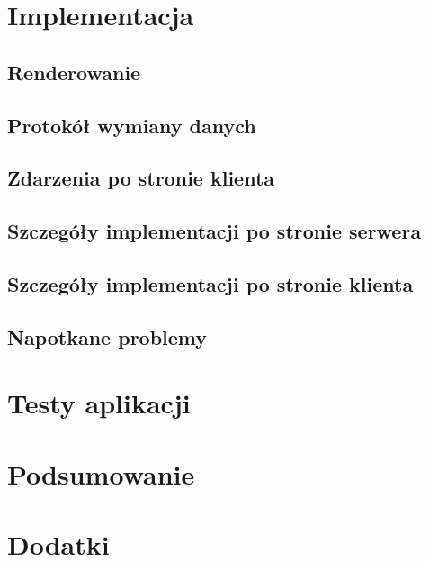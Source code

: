 \documentclass[polish]{inz}
\begin{document}
\chapter{Implementacja}
\section{Renderowanie}

\section{Protokół wymiany danych}
\label{data_protocol}

\section{Zdarzenia po stronie klienta}
\label{client_events}


\section{Szczegóły implementacji po stronie serwera}
\label{sec:implementation_server}


\section{Szczegóły implementacji po stronie klienta}


\section{Napotkane problemy}
\label{sec:napotkane_problemy}


\chapter{Testy aplikacji}


\chapter{Podsumowanie}


\chapter{Dodatki}


\printindex
\end{document}
